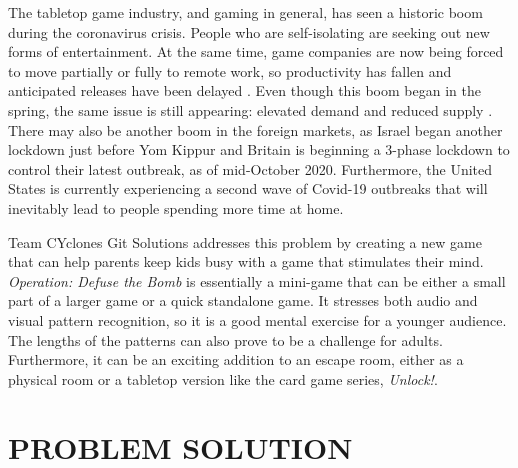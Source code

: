 \documentclass[12pt]{article}
\begin{document}
The tabletop game industry, and gaming in general, has seen a historic boom during the coronavirus crisis.  People who are self-isolating are seeking out new forms of entertainment. At the same time, game companies are now being forced to move partially or fully to remote work, so productivity has fallen and anticipated releases have been delayed \cite{nytimes}. Even though this boom began in the spring, the same issue is still appearing: elevated demand and reduced supply \cite{npd}. There may also be another boom in the foreign markets, as Israel began another lockdown just before Yom Kippur and Britain is beginning a 3-phase lockdown to control their latest outbreak, as of mid-October 2020.  Furthermore, the United States is currently experiencing a second wave of Covid-19 outbreaks that will inevitably lead to people spending more time at home.

Team CYclones Git Solutions addresses this problem by creating a new game that can help parents keep kids busy with a game that stimulates their mind. \textit{Operation: Defuse the Bomb} is essentially a mini-game  that can be either a small part of a larger game or a quick standalone game. It stresses both audio and visual pattern recognition, so it is a good mental exercise for a younger audience.  The lengths of the patterns can also prove to be a challenge for adults. Furthermore, it can be an exciting addition to an escape room, either as a physical room or a tabletop version like the card game series, \textit{Unlock!}.

\section{PROBLEM SOLUTION}
\end{document}
